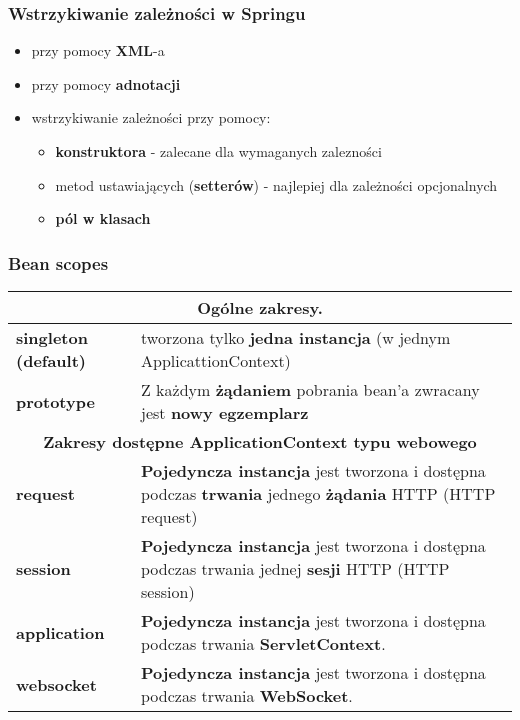 \documentclass[../main.tex]{subfiles}
\begin{document}
    \subsubsection{Wstrzykiwanie zależności w Springu}
    \begin{itemize}
        \item przy pomocy \textbf{XML}-a
        \item przy pomocy \textbf{adnotacji}
        \item wstrzykiwanie zależności przy pomocy:
        \begin{itemize}
            \item \textbf{konstruktora} - zalecane dla wymaganych zalezności
            \item metod ustawiających (\textbf{setterów}) - najlepiej dla zależności opcjonalnych
            \item \textbf{pól w klasach}
        \end{itemize}
    \end{itemize}

    \subsubsection{Bean scopes}
    \begin{table}[H]
        \begin{center}
            \begin{tabular}{| p{3.5cm} | p{12.5cm} |}
                \hline
                \multicolumn{2}{|c|}{\textbf{Ogólne zakresy.}}\\
                \hline
                \textbf{singleton (default)} &
                tworzona tylko \textbf{jedna instancja} (w jednym ApplicattionContext)\\
                \hline
                \textbf{prototype} & Z każdym \textbf{żądaniem} pobrania bean'a zwracany jest
                \textbf{nowy egzemplarz}\\
                \hline
                \hline
                \multicolumn{2}{|c|}{\textbf{Zakresy dostępne ApplicationContext typu webowego}}\\
                \hline
                \textbf{request} & \textbf{Pojedyncza instancja} jest tworzona i dostępna podczas
                \textbf{trwania} jednego \textbf{żądania} HTTP (HTTP request)\\
                \hline
                \textbf{session} &\textbf{Pojedyncza instancja} jest tworzona i dostępna podczas
                trwania jednej \textbf{sesji} HTTP (HTTP session)\\
                \hline
                \textbf{application} & \textbf{Pojedyncza instancja} jest tworzona i dostępna podczas
                trwania \textbf{ServletContext}.\\
                \hline
                \textbf{websocket} & \textbf{Pojedyncza instancja} jest tworzona i dostępna podczas
                trwania \textbf{WebSocket}.\\
                \hline
            \end{tabular}
        \end{center}
    \end{table}
\end{document}
